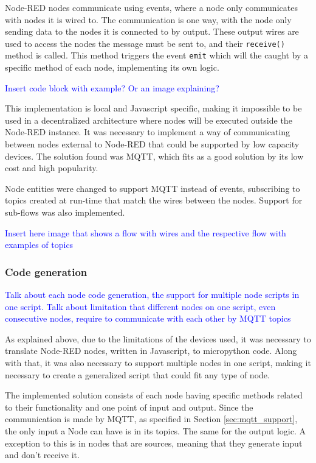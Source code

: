 Node-RED nodes communicate using events, where a node only communicates with nodes it is wired to. The communication is one way, with the node only sending data to the nodes it is connected to by output. These output wires are used to access the nodes the message must be sent to, and their \texttt{receive()} method is called. This method triggers the event \texttt{emit} which will the caught by a specific method of each node, implementing its own logic.

\textcolor{blue}{Insert code block with example? Or an image explaining?}

This implementation is local and Javascript specific, making it impossible to be used in a decentralized architecture where nodes will be executed outside the Node-RED instance. It was necessary to implement a way of communicating between nodes external to Node-RED that could be supported by low capacity devices. The solution found was MQTT, which fits as a good solution by its low cost and high popularity.

Node entities were changed to support MQTT instead of events, subscribing to topics created at run-time that match the wires between the nodes. Support for sub-flows was also implemented.

\textcolor{blue}{Insert here image that shows a flow with wires and the respective flow with examples of topics}

\subsubsection{Code generation}\label{sec:code_generation}

\textcolor{blue}{Talk about each node code generation, the support for multiple node scripts in one script. Talk about limitation that different nodes on one script, even consecutive nodes, require to communicate with each other by MQTT topics}

As explained above, due to the limitations of the devices used, it was necessary to translate Node-RED nodes, written in Javascript, to micropython code. Along with that, it was also necessary to support multiple nodes in one script, making it necessary to create a generalized script that could fit any type of node.

The implemented solution consists of each node having specific methods related to their functionality and one point of input and output. Since the communication is made by MQTT, as specified in Section \ref{sec:mqtt_support}, the only input a Node can have is in its topics. The same for the output logic. A exception to this is in nodes that are sources, meaning that they generate input and don't receive it. 


